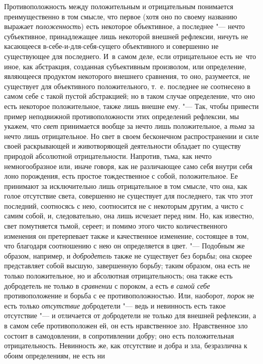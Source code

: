 Противоположность между положительным и отрицательным понимается
преимущественно в том смысле, что первое (хотя оно по своему названию
выражает {\em положенность}) есть некоторое
объективное, а последнее "--- нечто субъективное, принадлежащее лишь некоторой
внешней рефлексии, ничуть не касающееся в-себе-и-для-себя-сущего
объективного и совершенно не существующее для последнего. И~в самом деле,
если отрицательное есть не~что иное, как абстракция, созданная субъективным
произволом, или определение, являющееся продуктом некоторого внешнего
сравнения, то оно, разумеется, не существует для объективного
положительного, т.~е. последнее не соотнесено в самом себе с такой пустой
абстракцией; но в таком случае определение, что оно есть некоторое
положительное, также лишь внешне ему. "--- Так, чтобы привести пример
неподвижной противоположности этих определений рефлексии, мы укажем, что
{\em свет} принимается вообще за нечто лишь
положительное, а {\em тьма} за нечто лишь
отрицательное. Но свет в своем бесконечном распространении и силе своей
раскрывающей и животворяющей деятельности обладает по существу природой
абсолютной отрицательности. Напротив, тьма, как нечто немногообразное или,
иначе говоря, как не различающее само себя внутри себя лоно порождения,
есть простое тождественное с собой, положительное. Ее принимают за
исключительно лишь отрицательное в том смысле, что она, как голое
отсутствие света, совершенно не существует для последнего, так что этот
последний, соотносясь с нею, соотносится не с некоторым другим, а чисто с
самим собой, и, следовательно, она лишь исчезает перед ним. Но, как
известно, свет помутняется тьмой, сереет; и помимо этого чисто
количественного изменения он претерпевает также и качественное изменение,
состоящее в том, что благодаря соотношению с нею он определяется
в цвет. "--- Подобным же образом, например, и {\em добродетель}
также не существует без борьбы; она скорее представляет собой высшую,
завершенную борьбу; таким образом, она есть не только положительное, но и
абсолютная отрицательность; она также есть добродетель не только в
{\em сравнении} с пороком, а есть
{\em в самой себе} противоположение и борьба с ее
противоположностью. Или, наоборот, {\em порок} не есть
только {\em отсутствие} добродетели "--- ведь и невинность
есть такое отсутствие "--- и отличается от добродетели не только для внешней
рефлексии, а в самом себе противоположен ей, он есть нравственное
{\em зло}. Нравственное зло состоит в самодовлении, в
сопротивлении добру; оно есть положительная отрицательность. Невинность же,
как отсутствие и добра и зла, безразлична к обоим определениям, не есть ни
